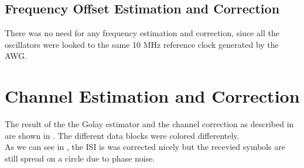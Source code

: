 \subsection{Frequency Offset Estimation and Correction}
There was no need for any frequency estimation and correction, since all the
oscillators were looked to the same 10 MHz reference clock generated
by the \gls{AWG}. \\

\section{Channel Estimation and Correction}
The result of the the Golay estimator and the channel correction
as described in  are shown in .
The different data blocks were colored differentely. \\

As we can see in , the \gls{ISI} is was
corrected nicely but the recevied symbols are still spread on a circle
due to phase noise. \\

